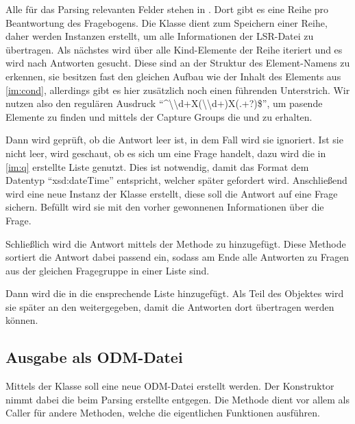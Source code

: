 Alle für das Parsing relevanten Felder stehen in . Dort gibt es eine Reihe pro Beantwortung des Fragebogens.
Die Klasse  dient zum Speichern einer Reihe, daher werden Instanzen erstellt, um alle Informationen der LSR-Datei zu übertragen.
Als nächstes wird über alle Kind-Elemente der Reihe iteriert und es wird nach Antworten gesucht.
Diese sind an der Struktur des Element-Namens zu erkennen, sie besitzen fast den gleichen Aufbau wie der Inhalt des Elements  aus \cref{im:cond}, allerdings gibt es hier zusätzlich noch einen führenden Unterstrich.
Wir nutzen also den regulären Ausdruck \enquote{\textasciicircum\textunderscore\textbackslash\textbackslash d+X(\textbackslash\textbackslash d+)X(.+?)\$}, um pasende Elemente zu finden und mittels der Capture Groups die  und  zu erhalten.

Dann wird geprüft, ob die Antwort leer ist, in dem Fall wird sie ignoriert.
Ist sie nicht leer, wird geschaut, ob es sich um eine  Frage handelt, dazu wird die in \cref{im:q} erstellte Liste genutzt. Dies ist notwendig, damit das Format dem Datentyp \enquote{xsd:dateTime} entspricht, welcher später gefordert wird.
Anschließend wird eine neue Instanz der Klasse  erstellt, diese soll die Antwort auf eine Frage sichern.
Befüllt wird sie mit den vorher gewonnenen Informationen über die Frage.


Schließlich wird die Antwort mittels der Methode  zu  hinzugefügt.
Diese Methode sortiert die Antwort dabei passend ein, sodass am Ende alle Antworten zu Fragen aus der gleichen Fragegruppe in einer Liste sind.

Dann wird die  in die ensprechende Liste hinzugefügt.
Als Teil des Objektes  wird sie später an den  weitergegeben, damit die Antworten dort übertragen werden können.

\subsection{Ausgabe als ODM-Datei}

Mittels der Klasse  soll eine neue ODM-Datei erstellt werden. Der Konstruktor nimmt dabei die beim Parsing erstellte  entgegen.
Die Methode  dient vor allem als Caller für andere Methoden, welche die eigentlichen Funktionen ausführen.

